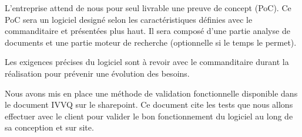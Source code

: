 
L'entreprise attend de nous pour seul livrable une preuve de concept (PoC).
Ce PoC sera un logiciel designé selon les caractéristiques définies avec le commanditaire et présentées plus haut.
Il sera composé d'une partie analyse de documents et une partie moteur de recherche (optionnelle si le temps le permet).

Les exigences précises du logiciel sont à revoir avec le commanditaire durant la réalisation pour prévenir une évolution des besoins.

Nous avons mis en place une méthode de validation fonctionnelle disponible dans le document IVVQ sur le sharepoint.
Ce document cite les tests que nous allons effectuer avec le client pour valider le bon fonctionnement du logiciel au long de sa conception et sur site.

